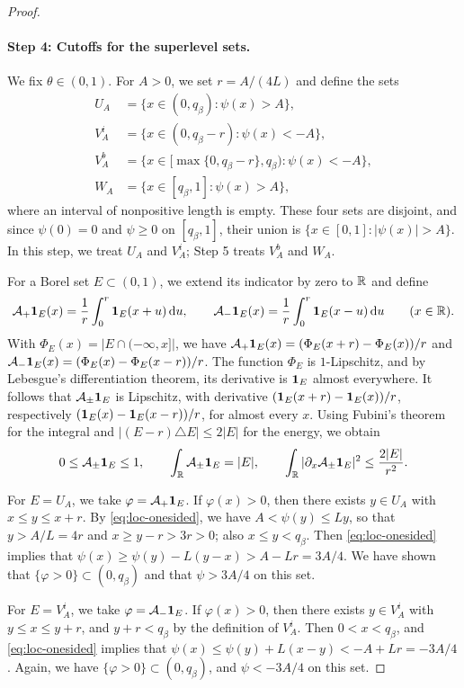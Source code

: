 \begin{proof}
\paragraph{Step 4: Cutoffs for the superlevel sets.}
We fix $\theta\in(0,1)$. For $A>0$, we set $r=A/(4L)$ and define the sets
\[
 \begin{aligned}
 U_A&=\{x\in(0,q_\beta):\psi(x)>A\},\\
 V_A^i&=\{x\in(0,q_\beta-r):\psi(x)<-A\},\\
 V_A^b&=\{x\in[\max\{0,q_\beta-r\},q_\beta):\psi(x)<-A\},\\
 W_A&=\{x\in[q_\beta,1]:\psi(x)>A\},
 \end{aligned}
\]
where an interval of nonpositive length is empty. These four sets are
disjoint, and since $\psi(0)=0$ and $\psi\ge0$ on $[q_\beta,1]$, their union is
$\{x\in[0,1]:|\psi(x)|>A\}$. In this step, we treat $U_A$ and $V_A^i$; Step 5
treats $V_A^b$ and $W_A$.

For a Borel set $E\subset(0,1)$, we extend its indicator by zero to $\mathbb R$ and
define
\[
 \mathcal A_+\mathbf1_E(x)=\frac1r\int_0^r\mathbf1_E(x+u)\,\mathrm d u,
 \qquad
 \mathcal A_-\mathbf1_E(x)=\frac1r\int_0^r\mathbf1_E(x-u)\,\mathrm d u
 \qquad(x\in\mathbb R).
\]
With $\Phi_E(x)=|E\cap(-\infty,x]|$, we have
$\mathcal A_+\mathbf1_E(x)=(\Phi_E(x+r)-\Phi_E(x))/r$ and
$\mathcal A_-\mathbf1_E(x)=(\Phi_E(x)-\Phi_E(x-r))/r$. The function $\Phi_E$ is
$1$-Lipschitz, and by Lebesgue's differentiation theorem, its derivative is
$\mathbf1_E$ almost everywhere. It follows that $\mathcal A_\pm\mathbf1_E$ is
Lipschitz, with derivative $(\mathbf1_E(x+r)-\mathbf1_E(x))/r$, respectively
$(\mathbf1_E(x)-\mathbf1_E(x-r))/r$, for almost every $x$. Using Fubini's theorem for the integral and
$|(E-r)\triangle E|\le2|E|$ for the energy, we obtain
\begin{equation}\label{eq:loc-averaging}
 0\le\mathcal A_\pm\mathbf1_E\le1,\qquad \int_\mathbb R\mathcal A_\pm\mathbf1_E=|E|,\qquad
 \int_\mathbb R|\partial_x\mathcal A_\pm\mathbf1_E|^2\le\frac{2|E|}{r^2}.
\end{equation}

For $E=U_A$, we take $\varphi=\mathcal A_+\mathbf1_E$. If $\varphi(x)>0$, then
there exists $y\in U_A$ with $x\le y\le x+r$. By \eqref{eq:loc-onesided}, we
have $A<\psi(y)\le Ly$, so that $y>A/L=4r$ and $x\ge y-r>3r>0$; also
$x\le y<q_\beta$. Then \eqref{eq:loc-onesided} implies that
$\psi(x)\ge\psi(y)-L(y-x)>A-Lr=3A/4$. We have shown that
$\{\varphi>0\}\subset(0,q_\beta)$ and that $\psi>3A/4$ on this set.

For $E=V_A^i$, we take $\varphi=\mathcal A_-\mathbf1_E$. If $\varphi(x)>0$, then
there exists $y\in V_A^i$ with $y\le x\le y+r$, and $y+r<q_\beta$ by the
definition of $V_A^i$. Then $0<x<q_\beta$, and \eqref{eq:loc-onesided} implies
that $\psi(x)\le\psi(y)+L(x-y)<-A+Lr=-3A/4$. Again, we have
$\{\varphi>0\}\subset(0,q_\beta)$, and $\psi<-3A/4$ on this set.


\end{proof}
